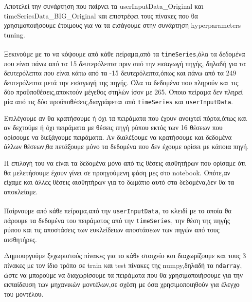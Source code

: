 \subsubsection{\texttt{}}

Αποτελεί την συνάρτηση που παίρνει τα userInputData\_Original και timeSeriesData\_BIG\_Original και επιστρέφει τους πίνακες που θα χρησιμοποιήσουμε έτοιμους για να τα εισάγουμε στην συνάρτηση hyperparameters tuning.

\paragraph{}
Ξεκινούμε με το να κόψουμε από κάθε πείραμα,από τα \texttt{\linebreak timeSeries},όλα τα δεδομένα που είναι πάνω από τα 15 δευτερόλεπτα πριν από την εισαγωγή πηγής,
δηλαδή για τα δευτερόλεπτα που είναι κάτω από τα -15 δευτερόλεπτα,όπως και πάνω από τα 249 δευτερόλεπτα μετά την εισαγωγή της πηγής.
Όλα τα δεδομένα που πληρούν και τις δύο προϋποθέσεις,αποκτούν μέγεθος στηλών ίσον με 265. 
Όποιο πείραμα δεν πληρεί μία από τις δύο προϋποθέσεις,διαγράφεται από \texttt{timeSeries} και \texttt{userInputData}.

Επιλέγουμε αν θα κρατήσουμε ή όχι τα πειράματα που έχουν ανοιχτεί πόρτα,όπως και αν δεχτούμε ή όχι πειράματα με θέσεις πηγή ρύπου εκτός των 16 θέσεων που ορίσουμε να διεξάγουμε πειράματα.
Αν διαλέξουμε να κρατήσουμε και δεδομένα άλλων θέσεων,θα πετάξουμε μόνο τα δεδομένα που δεν έχουμε ορίσει με κάποια πηγή.

Η επιλογή του να είναι τα δεδομένα μόνο από τις θέσεις αισθητήρων που ορίσαμε ότι θα μελετήσουμε έχουν γίνει σε προηγούμενη φάση μες στο notebook.
Οπότε,αν είχαμε και άλλες θέσεις αισθητήρων για το δωμάτιο αυτό στα δεδομένα,δεν θα τα αποκλείαμε.

\paragraph{\texttt{}}

Παίρνουμε από κάθε πείραμα,από την \texttt{userInputData}, 
το κλειδί με το οποία θα πάρουμε τα δεδομένα του πειράματος από την \texttt{timeSeries},
την θέση της πηγής ρύπου και τις αποστάσεις των ευκλείδειων αποστάσεων των πηγών από τους αισθητήρες.

Δημιουργούμε ξεχωριστούς πίνακες για το κάθε στοιχείο 
και διαχωρίζουμε και τους 3 πίνακες με τον ίδιο τρόπο σε train και test πίνακες της numpy,δηλαδή τα \texttt{ndarray},
ώστε να μπορούμε να διαχωρίσουμε τα πειράματα που θα χρησιμοποιήσουμε για την εκπαίδευση των μηχανικών μοντέλων,σε σχέση με όσα 
χρησιμοποιηθούν για έλεγχο του μοντέλου.

